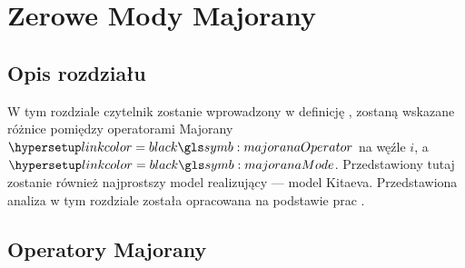 
\chapter{Zerowe Mody Majorany} \label{chap:majorana}

\section*{Opis rozdziału}

W tym rozdziale czytelnik zostanie wprowadzony w definicję \MZM, zostaną wskazane różnice pomiędzy operatorami Majorany $\gammai$ na węźle $i$, a \MZM\ $\Gammai$.
Przedstawiony tutaj zostanie również najprostszy model realizujący \MZM --- model Kitaeva.
Przedstawiona analiza w tym rozdziale została opracowana na podstawie prac \cite{kitaev.2001,stanescu.2016,wieckowski.maska.2018,sarma.freedman.2015}.



\section{Operatory Majorany}

